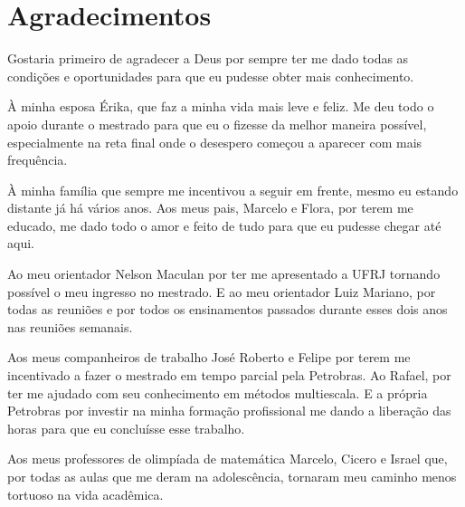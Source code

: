 \chapter*{Agradecimentos}

Gostaria primeiro de agradecer a Deus por sempre ter me dado todas as condições e oportunidades para que eu pudesse obter mais conhecimento. 

À minha esposa Érika, que faz a minha vida mais leve e feliz. Me deu todo o apoio durante o mestrado para que eu o fizesse da melhor maneira possível, especialmente na reta final onde o desespero começou a aparecer com mais frequência. 

À minha família que sempre me incentivou a seguir em frente, mesmo eu estando distante já há vários anos. Aos meus pais, Marcelo e Flora, por terem me educado, me dado todo o amor e feito de tudo para que eu pudesse chegar até aqui.

Ao meu orientador Nelson Maculan por ter me apresentado a UFRJ tornando possível o meu ingresso no mestrado. E ao meu orientador Luiz Mariano, por todas as reuniões e por todos os ensinamentos passados durante esses dois anos nas reuniões semanais. 

Aos meus companheiros de trabalho José Roberto e Felipe por terem me incentivado a fazer o mestrado em tempo parcial pela Petrobras. Ao Rafael, por ter me ajudado com seu conhecimento em métodos multiescala. E a própria Petrobras por investir na minha formação profissional me dando a liberação das horas para que eu concluísse esse trabalho.

Aos meus professores de olimpíada de matemática Marcelo, Cicero e Israel que, por todas as aulas que me deram na adolescência, tornaram meu caminho menos tortuoso na vida acadêmica.


